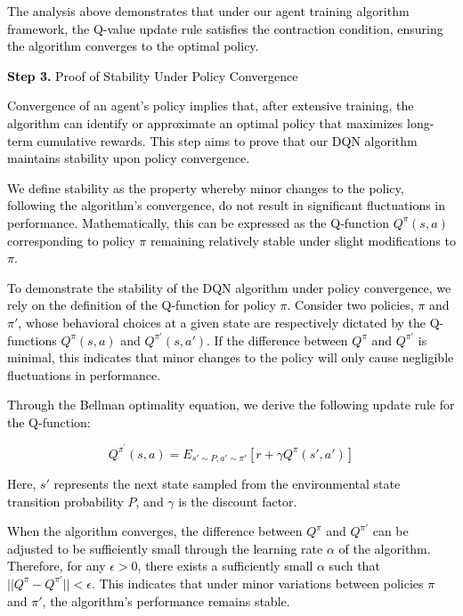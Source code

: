 \documentclass[preprint,12pt]{elsarticle}
\begin{document}
\textcolor{black}{The analysis above demonstrates that under our agent training algorithm framework, the Q-value update rule satisfies the contraction condition, ensuring the algorithm converges to the optimal policy.}

\textcolor{black}{\textbf{Step 3.}	Proof of Stability Under Policy Convergence}

\textcolor{black}{Convergence of an agent's policy implies that, after extensive training, the algorithm can identify or approximate an optimal policy that maximizes long-term cumulative rewards. This step aims to prove that our DQN algorithm maintains stability upon policy convergence.}

\textcolor{black}{We define stability as the property whereby minor changes to the policy, following the algorithm's convergence, do not result in significant fluctuations in performance. Mathematically, this can be expressed as the Q-function \(Q^\pi(s, a)\) corresponding to policy \(\pi\) remaining relatively stable under slight modifications to \(\pi\).}

\textcolor{black}{To demonstrate the stability of the DQN algorithm under policy convergence, we rely on the definition of the Q-function for policy \(\pi\). Consider two policies, \(\pi\) and \(\pi'\), whose behavioral choices at a given state are respectively dictated by the Q-functions \(Q^\pi(s, a)\) and \(Q^{\pi'}(s, a')\). If the difference between \(Q^\pi\) and \(Q^{\pi'}\) is minimal, this indicates that minor changes to the policy will only cause negligible fluctuations in performance.}

\textcolor{black}{Through the Bellman optimality equation, we derive the following update rule for the Q-function:}

\textcolor{black}{
\begin{equation}
    Q^{\pi^{'}}(s,a)=E_{s'\sim P,a'\sim \pi'}[r+\gamma Q^\pi (s',a')]
\end{equation}
}

\textcolor{black}{Here, \(s'\) represents the next state sampled from the environmental state transition probability \(P\), and \(\gamma\) is the discount factor.}

\textcolor{black}{When the algorithm converges, the difference between \(Q^\pi\) and \(Q^{\pi'}\) can be adjusted to be sufficiently small through the learning rate \(\alpha\) of the algorithm. Therefore, for any \(\epsilon > 0\), there exists a sufficiently small \(\alpha\) such that \(||Q^\pi - Q^{\pi'}|| < \epsilon\). This indicates that under minor variations between policies \(\pi\) and \(\pi'\), the algorithm's performance remains stable.}
\end{document}
